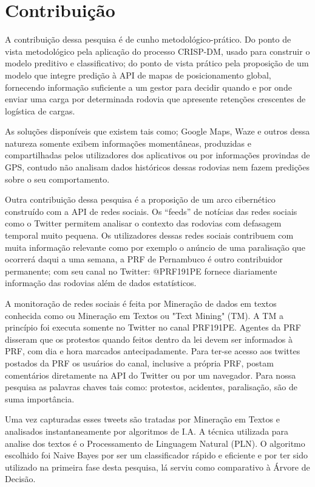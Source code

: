\chapter{Contribuição}\label{meto}

A contribuição dessa pesquisa é de cunho metodológico-prático.
Do ponto de vista metodológico pela aplicação do processo CRISP-DM, usado para construir o modelo preditivo e classificativo; do ponto de vista prático pela proposição de um modelo que integre predição à API de mapas de posicionamento global, fornecendo informação suficiente a um gestor para decidir quando e por onde enviar uma carga por determinada rodovia que apresente retenções crescentes de logística de cargas. 

As soluções disponíveis que existem tais como; Google Maps, Waze e outros dessa natureza somente exibem informações momentâneas, produzidas e compartilhadas pelos utilizadores dos aplicativos ou por informações provindas de GPS, contudo não analisam dados históricos dessas rodovias nem fazem predições sobre o seu comportamento.

Outra contribuição dessa pesquisa é a proposição de um arco cibernético construído com a API de redes sociais.
Os ``feeds'' de notícias das redes sociais como o Twitter permitem analisar o contexto das rodovias com defasagem temporal muito pequena.
Os utilizadores dessas redes sociais contribuem com muita informação relevante como por exemplo o anúncio de uma paralisação que ocorrerá 
daqui a uma semana, a PRF de Pernambuco é outro contribuidor permanente; com seu canal no Twitter: @PRF191PE fornece diariamente informação das rodovias 
além de dados estatísticos. 

A monitoração de redes sociais é feita por Mineração de dados em textos conhecida como ou Mineração em Textos ou "Text Mining" (TM).
A TM a princípio foi executa somente no Twitter no canal PRF191PE. Agentes da PRF disseram que os protestos quando feitos dentro da lei
devem ser informados à PRF, com dia e hora marcados antecipadamente.
Para ter-se acesso aos twittes postados da PRF os usuários do canal, inclusive a própria PRF, postam comentários diretamente 
na API do Twitter ou por um navegador. Para nossa pesquisa as palavras chaves tais como: protestos, acidentes, paralisação, são de suma importância.

Uma vez capturadas esses tweets são tratadas por Mineração em Textos e analisados instantaneamente por algoritmos de I.A. 
A técnica utilizada para analise dos textos é o Processamento de Linguagem Natural (PLN). O algoritmo escolhido foi Naive Bayes por ser um classificador rápido e eficiente e por ter sido utilizado na primeira fase desta pesquisa, lá serviu como comparativo à Árvore de Decisão.




